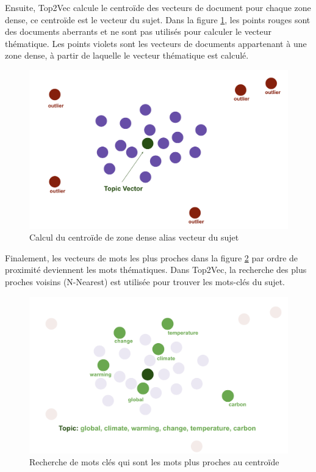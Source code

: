 Ensuite, Top2Vec calcule le centroïde des vecteurs de document pour chaque zone dense, ce centroïde est le vecteur du sujet.
Dans la figure \ref{fig:topic_vector}, les points rouges sont des documents aberrants et ne sont pas utilisés pour calculer le vecteur thématique. Les points violets sont les vecteurs de documents appartenant à une zone dense, à partir de laquelle le vecteur thématique est calculé.

\begin{figure}[H] %
    \centering
    \includegraphics[width=12cm]{img/topic_vector.png}
    \caption{Calcul du centroïde de zone dense alias vecteur du sujet}
    \label{fig:topic_vector}
\end{figure}

Finalement, les vecteurs de mots les plus proches dans la figure \ref{fig:find_keyword} par ordre de proximité deviennent les mots thématiques. Dans Top2Vec, la recherche des plus proches voisins (N-Nearest) est utilisée pour trouver les mots-clés du sujet. 

\begin{figure}[H] %
    \centering
    \includegraphics[width=12cm]{img/find_keyword.png}
    \caption{Recherche de mots clés qui sont les mots plus proches au centroïde}
    \label{fig:find_keyword}
\end{figure}

